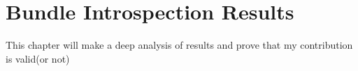 \chapter{Bundle Introspection Results}

This chapter will make a deep analysis of results and prove that my contribution is valid(or not)